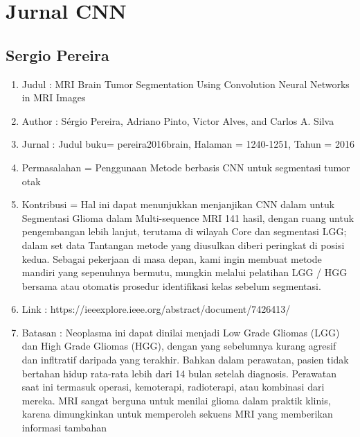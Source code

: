 \section{Jurnal CNN }
\subsection{Sergio Pereira}

\begin{enumerate}
  \item Judul : MRI Brain Tumor Segmentation Using Convolution Neural Networks in MRI Images
   \item Author : Sérgio Pereira, Adriano Pinto, Victor Alves, and Carlos A. Silva
    \item Jurnal : Judul buku= pereira2016brain, Halaman = 1240-1251, Tahun = 2016
     \item Permasalahan = Penggunaan Metode berbasis CNN untuk segmentasi tumor otak
      \item Kontribusi =  Hal ini dapat menunjukkan menjanjikan  CNN dalam untuk Segmentasi Glioma dalam Multi-sequence MRI 141 hasil, dengan ruang untuk pengembangan lebih lanjut, terutama di wilayah Core dan segmentasi LGG; dalam set data Tantangan metode yang diusulkan diberi peringkat di posisi kedua. Sebagai pekerjaan di masa depan, kami ingin membuat metode mandiri yang sepenuhnya bermutu, mungkin melalui pelatihan LGG / HGG bersama atau otomatis prosedur identifikasi kelas sebelum segmentasi.
\item Link : https://ieeexplore.ieee.org/abstract/document/7426413/
\item Batasan : Neoplasma ini dapat dinilai
menjadi Low Grade Gliomas (LGG) dan High Grade Gliomas (HGG), dengan yang sebelumnya kurang agresif dan infltratif daripada yang terakhir.  Bahkan dalam perawatan, pasien tidak bertahan hidup rata-rata lebih dari 14 bulan setelah diagnosis. Perawatan saat ini termasuk operasi, kemoterapi, radioterapi, atau kombinasi dari mereka. MRI sangat berguna untuk menilai glioma dalam praktik klinis, karena dimungkinkan untuk memperoleh sekuens MRI yang memberikan informasi tambahan 
 

\end{enumerate}
